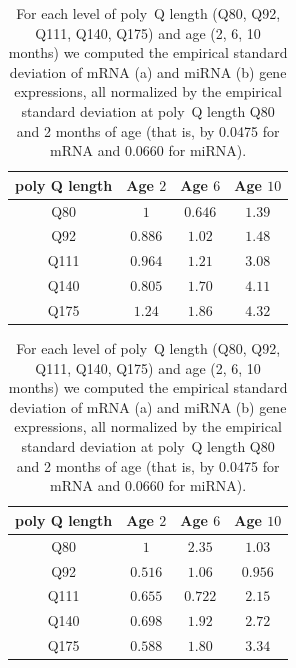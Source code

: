 \begin{table}
 \begin{minipage}{.5\linewidth}
      \centering
 \begin{tabular}{| c | c | c | c |}
      \hline
      poly Q length & Age $2$ & Age $6$ & Age $10$ \\ 
      \hline
      Q80             & $1$         & $0.646$ & $1.39$\\
      Q92             & $0.886$  & $1.02$   & $1.48$\\
      Q111           & $0.964$   & $1.21$  & $3.08$\\
      Q140          & $0.805$   & $1.70$  & $4.11$\\
      Q175          & $1.24$     & $1.86$  & $4.32$\\
      \hline
    \end{tabular}  
     \caption{mRNA}
    \end{minipage}%
    \begin{minipage}{.5\linewidth}
      \centering
\begin{tabular}{| c | c | c | c |}
      \hline
      poly Q length & Age $2$     & Age $6$     & Age $10$ \\ 
      \hline
      Q80             & $1$        & $2.35$   & $1.03$ \\
      Q92             & $0.516$ & $1.06$   & $0.956$\\
      Q111            & $0.655$ & $0.722$ & $2.15$ \\
      Q140           & $0.698$ & $1.92$   & $2.72$ \\
      Q175           & $0.588$ & $1.80$   & $3.34$ \\
      \hline         
    \end{tabular}
     \caption{miRNA}
    \end{minipage} 
 \caption{For each level  of poly~Q length (Q80, Q92,  Q111, Q140, Q175)
      and age (2,  6, 10 months) we computed the  empirical standard deviation
      of  mRNA (a)  and  miRNA (b)  gene expressions,  all  normalized by  the
      empirical standard  deviation at poly~Q length  Q80 and 2 months  of age
      (that is, by 0.0475 for mRNA and 0.0660 for miRNA).}
  \label{tab:mRNA:miRNA:sd}
\end{table}
